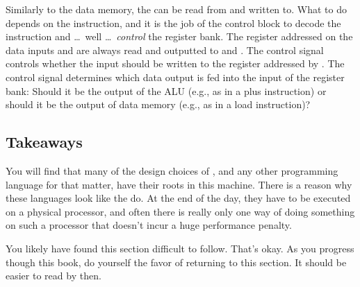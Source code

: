 Similarly to the data memory, the  can be read from and written to. What to do depends on the instruction, and it is the job of the control block to decode the instruction and \ldots\ well \ldots\ \textsl{control} the register bank. The register addressed on the data inputs  and  are always read and outputted to  and . The  control signal controls whether the  input should be written to the register addressed by . The  control signal determines which data output is fed into the  input of the register bank: Should it be the output of the ALU (e.g., as in a plus instruction) or should it be the output of data memory (e.g., as in a load instruction)?

\subsection{Takeaways}

You will find that many of the design choices of \csharp, and any other programming language for that matter, have their roots in this machine. There is a reason why these languages look like the do. At the end of the day, they have to be executed on a physical processor, and often there is really only one way of doing something on such a processor that doesn't incur a huge performance penalty.

You likely have found this section difficult to follow. That's okay. As you progress though this book, do yourself the favor of returning to this section. It should be easier to read by then.


